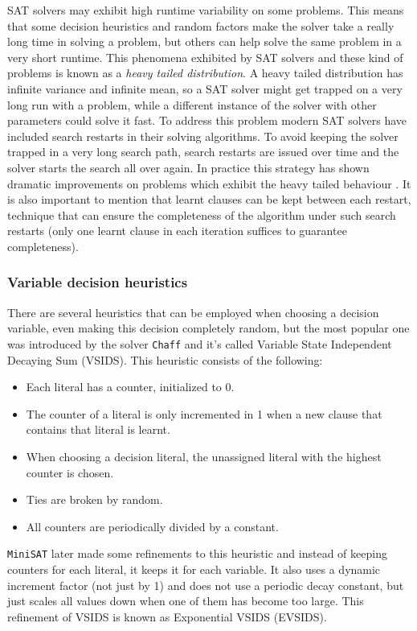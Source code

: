 \documentclass[12pt]{diicc}
\begin{document}
SAT solvers may exhibit high runtime variability on some problems. This means that some decision heuristics and random factors make the solver take a really long time in solving a problem, but others can help solve the same problem in a very short runtime. This phenomena exhibited by SAT solvers and these kind of problems is known as a \textit{heavy tailed distribution}. A heavy tailed distribution has infinite variance and infinite mean, so a SAT solver might get trapped on a very long run with a problem, while a different instance of the solver with other parameters could solve it fast. To address this problem modern SAT solvers have included search restarts in their solving algorithms. To avoid keeping the solver trapped in a very long search path, search restarts are issued over time and the solver starts the search all over again. In practice this strategy has shown dramatic improvements on problems which exhibit the heavy tailed behaviour \cite{heavytail}. It is also important to mention that learnt clauses can be kept between each restart, technique that can ensure the completeness of the algorithm under such search restarts (only one learnt clause in each iteration suffices to guarantee completeness\cite{LMS07}). 

\subsubsection{Variable decision heuristics}

There are several heuristics that can be employed when choosing a decision variable, even making this decision completely random, but the most popular one was introduced by the solver \texttt{Chaff} and it's called Variable State Independent Decaying Sum (VSIDS). This heuristic consists of the following:
\begin{itemize}
	\item Each literal has a counter, initialized to 0.
	\item The counter of a literal is only incremented in 1 when a new clause that contains that literal is learnt.
	\item When choosing a decision literal, the unassigned literal with the highest counter is chosen.
	\item Ties are broken by random.
	\item All counters are periodically divided by a constant.
\end{itemize}
\texttt{MiniSAT} \cite{minisat} later made some refinements to this heuristic and instead of keeping counters for each literal, it keeps it for each variable. It also uses a dynamic increment factor (not just by 1) and does not use a periodic decay constant, but just scales all values down when one of them has become too large. This refinement of VSIDS is known as Exponential VSIDS (EVSIDS). 
\end{document}

